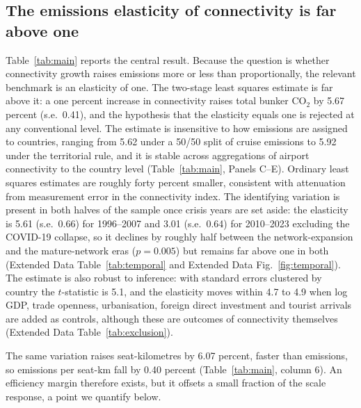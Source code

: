 \documentclass[12pt]{article}
\begin{document}
\subsection*{The emissions elasticity of connectivity is far above one}
Table~\ref{tab:main} reports the central result. Because the question is
whether connectivity growth raises emissions more or less than
proportionally, the relevant benchmark is an elasticity of one. The
two-stage least squares estimate is far above it: a one percent increase in
connectivity raises total bunker CO$_2$ by 5.67 percent (s.e.\ 0.41), and
the hypothesis that the elasticity equals one is rejected at any
conventional level. The estimate is insensitive to how emissions are
assigned to countries, ranging from 5.62 under a 50/50 split of cruise
emissions to 5.92 under the territorial rule, and it is stable across
aggregations of airport connectivity to the country level
(Table~\ref{tab:main}, Panels C--E). Ordinary least squares estimates are
roughly forty percent smaller, consistent with attenuation from measurement
error in the connectivity index. The identifying variation is present in
both halves of the sample once crisis years are set aside: the elasticity
is 5.61 (s.e.\ 0.66) for 1996--2007 and 3.01 (s.e.\ 0.64) for 2010--2023
excluding the COVID-19 collapse, so it declines by roughly half between the
network-expansion and the mature-network eras ($p = 0.005$) but remains far
above one in both (Extended Data Table~\ref{tab:temporal} and Extended Data
Fig.~\ref{fig:temporal}). The estimate is also robust to inference: with
standard errors clustered by country the $t$-statistic is 5.1, and the
elasticity moves within 4.7 to 4.9 when log GDP, trade openness,
urbanisation, foreign direct investment and tourist arrivals are added as
controls, although these are outcomes of connectivity themselves
(Extended Data Table~\ref{tab:exclusion}).

The same variation raises seat-kilometres by 6.07 percent, faster than
emissions, so emissions per seat-km fall by 0.40 percent
(Table~\ref{tab:main}, column 6). An efficiency margin therefore exists,
but it offsets a small fraction of the scale response, a point we quantify
below.
\end{document}
